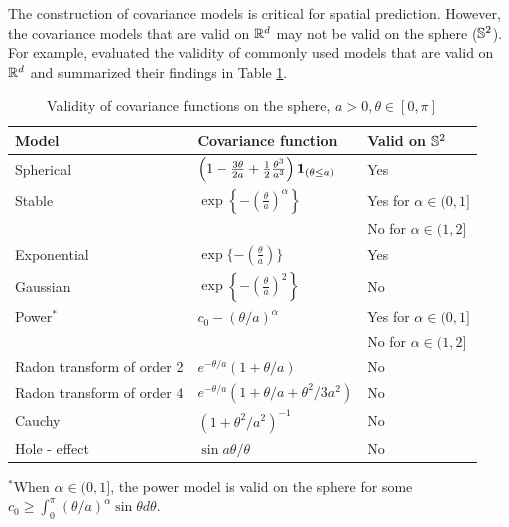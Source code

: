 The construction of covariance models is critical for spatial prediction. However, the covariance models that are valid on $\mathbb{R}^d$ may not be valid on the sphere ($\mathbb{S}^2$). For example, \cite{HuangZhangRobeson2011} evaluated the validity of commonly used \cov models that are valid on $\mathbb{R}^d$ and summarized their findings in Table \ref{tab:cov_sphere}.

	\begin{table}[H]
		\label{valid_cov_models}
		\centering
		\caption [Validity of Covariance Functions on the Sphere]{Validity of covariance functions on the sphere, $a >0,\theta \in [0,\pi]$}
		\label{tab:cov_sphere}
		\vskip 16pt
		\begin{tabular}[htb]{lll} \hline \hline
			Model & Covariance function & Valid on $\mathbb{S}^2$           \\   \hline Spherical  &
			$\left(1-\frac{3\theta}{2a} + \frac{1}{2}
			\frac{\theta^3}{a^3}\right){\bf 1}_{(\theta \le a)}$ & Yes   \\
			[2ex]
			Stable     & $\exp\left\{-\left(\frac{\theta}{a}\right)^\alpha\right\}$ & Yes for $\alpha \in (0,1]$  \\
			      &                     & No for $\alpha \in (1,2]$ \\ [2ex] \hspace{0.2in} Exponential &
			$\exp \{-\left(\frac{\theta}{a}\right) \}$ & Yes \\ [2ex]
			\hspace{0.2in} Gaussian & $\exp\left\{-\left(\frac{\theta}{a} \right)^2
			\right\}$  & No \\ [2ex]
			Power$^*$  & $c_0 - (\theta/a)^\alpha$ & Yes for  $\alpha \in (0,1] $  \\
			& & No for $\alpha \in (1,2]$ \\ [2ex]
			Radon transform of order 2         & $e^{-\theta/a}(1+\theta/a)$ &
			No        \\ [2ex] Radon transform of order 4         &
			$e^{-\theta/a} (1+\theta/a+\theta^2/3a^2)$  & No  \\ [2ex] Cauchy &
			$(1+\theta^2/a^2)^{-1}$ &  No      \\ [2ex] Hole - effect & $\sin
			a\theta / \theta$ & No    \\ \hline \hline
		\end{tabular}
	\vskip 8pt	
$^*$When $\alpha \in (0,1]$, the power model is valid on the sphere  for some $c_0 \ge \int_0^\pi (\theta/a)^{\alpha} \sin \theta d \theta$.
		\end{table}
		 
